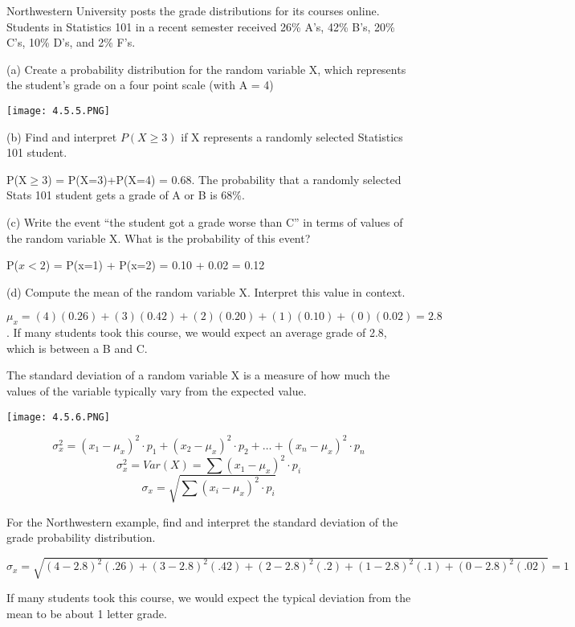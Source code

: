 \documentclass[../stats.tex]{subfiles}
\begin{document}
\pagebreak
\begin{example}
    Northwestern University posts the grade distributions for its courses online. Students in Statistics 101 in a recent semester received 26\% A's, 42\% B's, 20\% C's, 10\% D's, and 2\% F's.

    (a) Create a probability distribution for the random variable X, which represents the student's grade on a four point scale (with A = 4)
    \begin{center}
        \texttt{[image: 4.5.5.PNG]}
    \end{center}

    (b) Find and interpret $P(X\geq 3)$ if X represents a randomly selected Statistics 101 student.

    P(X$\geq 3$) = P(X=3)+P(X=4) = 0.68. The probability that a randomly selected Stats 101 student gets a grade of A or B is 68\%.

    (c) Write the event ``the student got a grade worse than C'' in terms of values of the random variable X. What is the probability of this event?

    P($x<2$) = P(x=1) + P(x=2) = 0.10 + 0.02 = 0.12

    (d) Compute the mean of the random variable X. Interpret this value in context.

    $\mu_x = (4)(0.26)+(3)(0.42)+(2)(0.20)+(1)(0.10)+(0)(0.02) = 2.8$. If many students took this course, we would expect an average grade of 2.8, which is between a B and C.
\end{example}

The standard deviation of a random variable X is a measure of how much the values of the variable typically vary from the expected value.
\begin{center}
    \texttt{[image: 4.5.6.PNG]}
\end{center}
\[ \sigma_x^2 = (x_1-\mu_x)^2\cdot p_1+(x_2-\mu_x)^2\cdot p_2+\dots + (x_n-\mu_x)^2\cdot p_n \]
\[ \sigma_x^2 = Var(X)=\sum(x_1-\mu_x)^2\cdot p_i \]
\[ \sigma_x = \sqrt{\sum (x_i-\mu_x)^2\cdot p_i}\]

\begin{example}
    For the Northwestern example, find and interpret the standard deviation of the grade probability distribution.

    $\sigma_x = \sqrt{(4-2.8)^2(.26)+(3-2.8)^2(.42)+(2-2.8)^2(.2)+(1-2.8)^2(.1)+(0-2.8)^2(.02)}=1$

    If many students took this course, we would expect the typical deviation from the mean to be about 1 letter grade.
\end{example}
\end{document}
